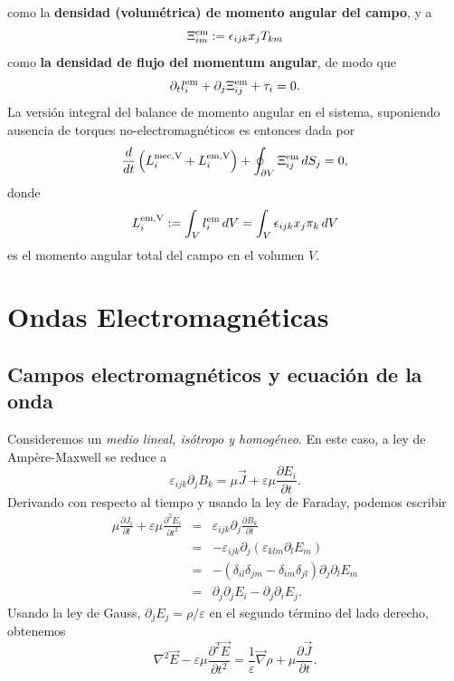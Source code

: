 como la \textbf{densidad (volumétrica) de momento angular del campo}, y a
\begin{equation}
\Xi_{im}^{\rm em}:=\epsilon _{ijk}x_{j}T_{km}
\end{equation}
como \textbf{la densidad de flujo del momentum angular}, de modo que
\begin{equation}
\partial _{t}l_{i}^{\rm em} + \partial _{j}\Xi_{ij}^{\rm em} + \tau_i =0.
\end{equation}
La versión integral del balance de momento angular en el sistema, suponiendo ausencia de torques no-electromagnéticos es entonces dada por
\begin{equation}
\frac{d}{dt}\left(L_i^{\rm mec,V}+L_i^{\rm em,V}\right) + \oint_{\partial V}\Xi_{ij}^{\rm em}\,dS_j = 0,
\end{equation}
donde 
\begin{equation}
L_i^{\rm em,V} := \int_V l_{i}^{\rm em}\,dV= \int_V \epsilon _{ijk}x_{j}\pi_{k}\,dV
\end{equation}
es el momento angular total del campo en el volumen $V$.


\section{Ondas Electromagnéticas}

\subsection{Campos electromagnéticos y ecuación de la onda}

Consideremos un \textit{medio lineal, isótropo y homogéneo}. En este caso, a ley de Amp\`ere-Maxwell se reduce a
\begin{equation}
\varepsilon_{ijk}\partial_jB_k=\mu\vec{J}+\varepsilon\mu\frac{\partial E_i}{\partial t}.
\end{equation}
Derivando con respecto al tiempo y usando la ley de Faraday, podemos escribir
\begin{eqnarray}
\mu \frac{\partial J_i}{\partial t}+\varepsilon\mu\frac{\partial^2E_i}{\partial t^2}
&=&\varepsilon_{ijk}\partial_j\frac {\partial B_k}{\partial t} \\
&=&-\varepsilon_{ijk}\partial_j\left(\varepsilon_{klm}\partial_lE_m \right)\\
&=&-\left( \delta_{il}\delta_{jm}-\delta_{im}\delta_{jl}\right)
\partial_j\partial_lE_m\\
&=&\partial_j\partial_jE_i-\partial_j\partial_iE_j.
\end{eqnarray}
Usando la ley de Gauss, $\partial_jE_j=\rho/\varepsilon$ en el segundo término del lado derecho, obtenemos
\begin{equation}\label{EcOihE}
\boxed{\nabla^2\vec{E}-\varepsilon\mu\frac{\partial^2\vec{E}}{\partial t^2}=\frac{1}{\varepsilon}\vec\nabla\rho+\mu\frac{\partial\vec{J}}{\partial t}.}
\end{equation}

